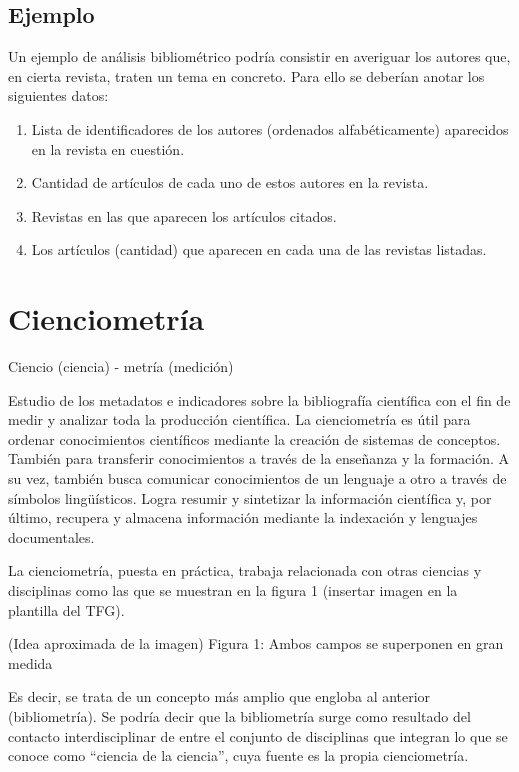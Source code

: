 \subsection{Ejemplo}

Un ejemplo de análisis bibliométrico podría consistir en averiguar los autores que, en cierta revista, traten un tema en concreto. Para ello se deberían anotar los siguientes datos:
\begin{enumerate}
    \item Lista de identificadores de los autores (ordenados alfabéticamente) aparecidos en la revista en cuestión.
    \item Cantidad de artículos de cada uno de estos autores en la revista.
    \item Revistas en las que aparecen los artículos citados.
    \item Los artículos (cantidad) que aparecen en cada una de las revistas listadas.
\end{enumerate}


\section{Cienciometría}

Ciencio (ciencia) - metría (medición)

Estudio de los metadatos e indicadores sobre la bibliografía científica con el fin de medir y analizar toda la producción científica.
La cienciometría es útil para ordenar conocimientos científicos mediante la creación de sistemas de conceptos. También para transferir conocimientos a través de la enseñanza y la formación. A su vez, también busca comunicar conocimientos de un lenguaje a otro a través de símbolos lingüísticos. Logra resumir y sintetizar la información científica y, por último, recupera y almacena información mediante la indexación y lenguajes documentales.

La cienciometría, puesta en práctica, trabaja relacionada con otras ciencias y disciplinas como las que se muestran en la figura 1 (insertar imagen en la plantilla del TFG).

(Idea aproximada de la imagen)
Figura 1: Ambos campos se superponen en gran medida


Es decir, se trata de un concepto más amplio que engloba al anterior (bibliometría). Se podría decir que la bibliometría surge como resultado del contacto interdisciplinar de entre el conjunto de disciplinas que integran lo que se conoce como ``ciencia de la ciencia'', cuya fuente es la propia cienciometría.
 

